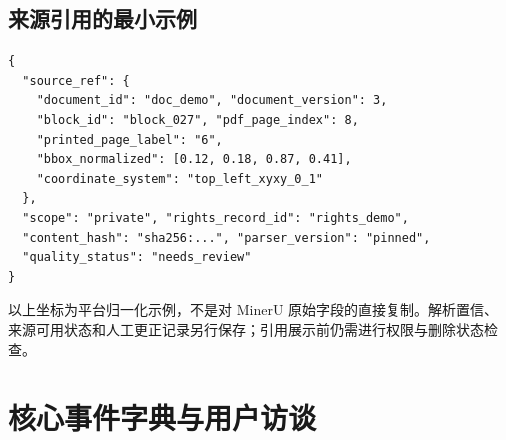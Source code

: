 \documentclass[UTF8,a4paper,11pt,fontset=none]{ctexart}
\newcommand{\minor}[1]{{\small\color{Muted}#1}}
\newcommand{\newsec}[1]{\clearpage\section{#1}}
\begin{document}
\subsection{来源引用的最小示例}
\begin{lstlisting}
{
  "source_ref": {
    "document_id": "doc_demo", "document_version": 3,
    "block_id": "block_027", "pdf_page_index": 8,
    "printed_page_label": "6",
    "bbox_normalized": [0.12, 0.18, 0.87, 0.41],
    "coordinate_system": "top_left_xyxy_0_1"
  },
  "scope": "private", "rights_record_id": "rights_demo",
  "content_hash": "sha256:...", "parser_version": "pinned",
  "quality_status": "needs_review"
}
\end{lstlisting}
\minor{以上坐标为平台归一化示例，不是对 MinerU 原始字段的直接复制。解析置信、来源可用状态和人工更正记录另行保存；引用展示前仍需进行权限与删除状态检查。}

\newsec{核心事件字典与用户访谈}
\end{document}
